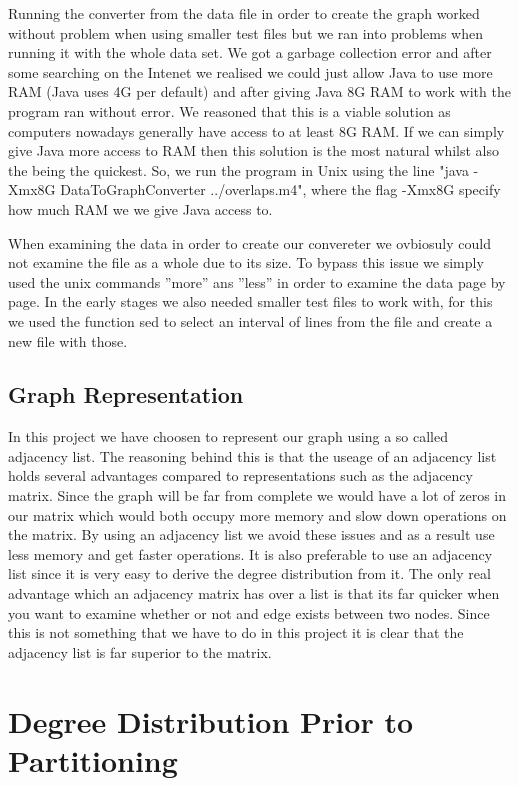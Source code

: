 \documentclass[a4paper,10pt]{article}
\begin{document}
Running the converter from the data file in order to create the graph worked without problem when using smaller test files but we ran into problems when running it with the whole data set. We got a garbage collection error and after some searching on the Intenet we realised we could just allow Java to use more RAM (Java uses 4G per default) and after giving Java 8G RAM to work with the program ran without error. We reasoned that this is a viable solution as computers nowadays generally have access to at least 8G RAM. 
If we can simply give Java more access to RAM then this solution is the most natural whilst also the being the quickest. So, we run the program in Unix using the line "java -Xmx8G DataToGraphConverter ../overlaps.m4", where the flag -Xmx8G specify how much RAM we we give Java access to.

\medskip

When examining the data in order to create our convereter we ovbiosuly could not examine the file as a whole due to its size. To bypass this issue we simply used the unix commands ''more'' ans ''less'' in order to examine the data page by page. In the early stages we also needed smaller test files to work with, for this we used the function sed to select an interval of lines from the file and create a new file with those. 

\subsection{Graph Representation}

In this project we have choosen to represent our graph using a so called adjacency list. The reasoning behind this is that the useage of an adjacency list holds several advantages compared to representations such as the adjacency matrix. Since the graph will be far from complete we would have a lot of zeros in our matrix which would both occupy more memory and slow down operations on the matrix. By using an adjacency list we avoid these issues and as a result use less memory and get faster operations. It is also preferable to use an adjacency list since it is very easy to derive the degree distribution from it. The only real advantage which an adjacency matrix has over a list is that its far quicker when you want to examine whether or not and edge exists between two nodes. Since this is not something that we have to do in this project it is clear that the adjacency list is far superior to the matrix. 

\section{Degree Distribution Prior to Partitioning}
\end{document}
